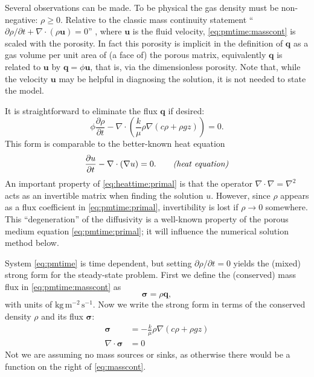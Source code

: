 \documentclass[11pt]{amsart}
\newcommand{\bq}{\mathbf{q}}
\newcommand{\bu}{\mathbf{u}}
\newcommand{\bsigma}{\bm{\sigma}}
\newcommand{\Div}{\nabla\cdot}
\newcommand{\grad}{\nabla}
\begin{document}
Several observations can be made.  To be physical the gas density must be non-negative: $\rho\ge 0$.  Relative to the classic mass continuity statement ``$\partial\rho/\partial t + \Div(\rho \bu)=0$'' \citep{Tadmor2012}, where $\bu$ is the fluid velocity, \eqref{eq:pmtime:masscont} is scaled with the porosity.  In fact this porosity is implicit in the definition of $\bq$ as a gas volume per unit area of (a face of) the porous matrix, equivalently $\bq$ is related to $\bu$ by $\bq = \phi \bu$, that is, via the dimensionless porosity.  Note that, while the velocity $\bu$ may be helpful in diagnosing the solution, it is not needed to state the model.

It is straightforward to eliminate the flux $\bq$ if desired:
\begin{equation}
\phi \frac{\partial \rho}{\partial t} - \Div \left(\frac{k}{\mu} \rho \grad\left(c \rho + \rho g z\right)\right) = 0. \label{eq:pmtime:primal}
\end{equation}
This form is comparable to the better-known heat equation
\begin{equation}
\frac{\partial u}{\partial t} - \Div(\grad u) = 0. \qquad \text{\emph{(heat equation)}}\label{eq:heattime:primal}
\end{equation}
An important property of \eqref{eq:heattime:primal} is that the operator $\Div \grad = \grad^2$ acts as an invertible matrix when finding the solution $u$.  However, since $\rho$ appears as a flux coefficient in \eqref{eq:pmtime:primal}, invertibility is lost if $\rho\to 0$ somewhere.  This ``degeneration'' of the diffusivity is a well-known property \citep{Vazquez2007} of the porous medium equation \eqref{eq:pmtime:primal}; it will influence the numerical solution method below.

System \eqref{eq:pmtime} is time dependent, but setting $\partial \rho/\partial t = 0$ yields the (mixed) strong form for the steady-state problem.  First we define the (conserved) mass flux in \eqref{eq:pmtime:masscont} as
\begin{equation}
\bsigma = \rho \bq, \label{eq:massflux}
\end{equation}
with units of $\text{kg}\,\text{m}^{-2}\,\text{s}^{-1}$.  Now we write the strong form in terms of the conserved density $\rho$ and its flux $\bsigma$:
\begin{subequations}
\label{eq:pm:strong}
\begin{align}
\bsigma &= - \frac{k}{\mu} \rho \grad\left(c \rho + \rho g z\right) \label{eq:darcy} \\
\Div \bsigma &= 0 \label{eq:masscont}
\end{align}
\end{subequations}
Not we are assuming no mass sources or sinks, as otherwise there would be a function on the right of \eqref{eq:masscont}.
\end{document}
